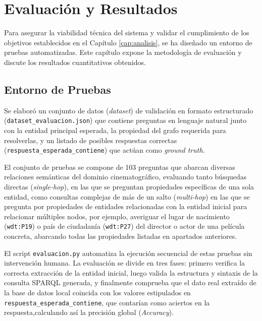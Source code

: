 
\chapter{Evaluación y Resultados}
\label{cap:evaluacion}

Para asegurar la viabilidad técnica del sistema y validar el cumplimiento de los objetivos establecidos en el Capítulo \ref{cap:analisis}, se ha diseñado un entorno de pruebas automatizadas. Este capítulo expone la metodología de evaluación y discute los resultados cuantitativos obtenidos.

\section{Entorno de Pruebas}

Se elaboró un conjunto de datos (\textit{dataset}) de validación en formato estructurado (\texttt{dataset\_evaluacion.json}) que contiene preguntas en lenguaje natural junto con la entidad principal esperada, la propiedad del grafo requerida para resolverlas, y un listado de posibles respuestas correctas (\texttt{respuesta\_esperada\_contiene}) que actúan como \textit{ground truth}.

El conjunto de pruebas se compone de 103 preguntas que abarcan diversas relaciones semánticas del dominio cinematográfico, evaluando tanto búsquedas directas (\textit{single-hop}), en las que se preguntan propiedades específicas de una sola entidad, como consultas complejas de más de un salto (\textit{multi-hop}) en las que se pregunta por propiedades de entidades relacionadas con la entidad inicial para relacionar múltiples nodos, por ejemplo, averiguar el lugar de nacimiento (\texttt{wdt:P19}) o país de ciudadanía (\texttt{wdt:P27}) del director o actor de una película concreta, abarcando todas las propiedades listadas en apartados anteriores.

El script \texttt{evaluacion.py} automatiza la ejecución secuencial de estas pruebas sin intervención humana. La evaluación se divide en tres fases: primero verifica la correcta extracción de la entidad inicial, luego valida la estructura y sintaxis de la consulta SPARQL generada, y finalmente comprueba que el dato real extraído de la base de datos local coincida con los valores estipulados en \texttt{respuesta\_esperada\_contiene}, que contarían como aciertos en la respuesta,calculando así la precisión global (\textit{Accuracy}).

